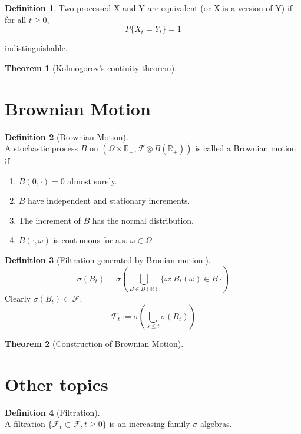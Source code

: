 \documentclass[12pt]{book}
\theoremstyle{definition}
\newtheorem{definition}{Definition}[chapter]
\newtheorem{theorem}{Theorem}[chapter]
\newcommand{\R}{\mathbb{R}}
\begin{document}
\begin{definition}
Two processed X and Y are equivalent (or X is a version of Y) if for all $t\geq 0$,
$$
P\{X_t=Y_t\}=1
$$	
\end{definition}
indistinguishable.
\begin{theorem}[Kolmogorov's contiuity theorem]
	
\end{theorem}
\section{Brownian Motion}
\begin{definition}[Brownian Motion] \ \\
A stochastic process $B$ on $(\Omega \times \R_+, \mathcal F \otimes B(\R_+))$ is called a Brownian motion if 
\begin{enumerate}
  \item $B(0,\cdot)=0$ almost surely.
  \item $B$ have independent and stationary increments.
  \item The increment of $B$ has the normal distribution.
  \item $B(\cdot,\omega)$ is continuous for a.s. $\omega\in \Omega$.
\end{enumerate}
\end{definition}

\begin{definition}[Filtration generated by Bronian motion.] \ \\
$$
\sigma(B_t) = \sigma(\bigcup_{B \in B(\R)}\{\omega:B_t(\omega)\in B\})
$$
Clearly $\sigma(B_t) \subset \mathcal F$.
$$
\mathcal{F}_t := \sigma(\bigcup_{s\leq t}\sigma(B_t))
$$
\end{definition}


\begin{theorem}[Construction of Brownian Motion]
	
\end{theorem}

\section{Other topics}
\begin{definition}[Filtration] \ \\
A filtration $\{\mathcal{F}_t\subset \mathcal{F},t \geq 0\}$ is an increasing family $\sigma$-algebras.
	
\end{definition}
\end{document}
